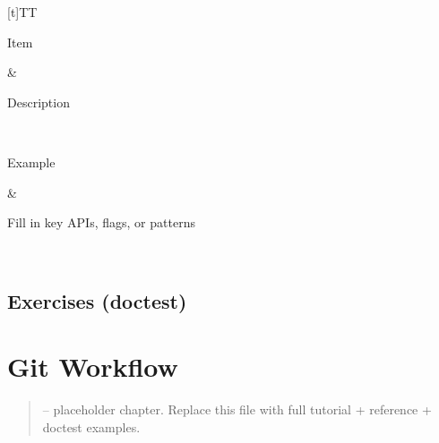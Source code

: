 \documentclass[a4paper,11pt,english]{sphinxmanual}
\begin{document}
\begin{savenotes}\sphinxattablestart
\sphinxthistablewithglobalstyle
\centering
\begin{tabulary}{\linewidth}[t]{TT}
\sphinxtoprule
\begin{varwidth}[t]{}
\sphinxstyletheadfamily \sphinxAtStartPar
Item
\sphinxbeforeendvarwidth
\end{varwidth}%
&\begin{varwidth}[t]{}
\sphinxstyletheadfamily \sphinxAtStartPar
Description
\sphinxbeforeendvarwidth
\end{varwidth}%
\\
\sphinxmidrule
\sphinxtableatstartofbodyhook\begin{varwidth}[t]{}
\sphinxAtStartPar
Example
\sphinxbeforeendvarwidth
\end{varwidth}%
&\begin{varwidth}[t]{}
\sphinxAtStartPar
Fill in key APIs, flags, or patterns
\sphinxbeforeendvarwidth
\end{varwidth}%
\\
\sphinxbottomrule
\end{tabulary}
\sphinxtableafterendhook\par
\sphinxattableend\end{savenotes}


\subsection{Exercises (doctest)}
\label{\detokenize{tooling/containerisation:exercises-doctest}}
\begin{sphinxVerbatim}[commandchars=\\\{\}]
\end{sphinxVerbatim}

\sphinxstepscope


\section{Git Workflow}
\label{\detokenize{tooling/git_workflow:git-workflow}}\label{\detokenize{tooling/git_workflow::doc}}\begin{quote}

\sphinxAtStartPar
{} – placeholder chapter. Replace this file with full tutorial + reference + doctest examples.
\end{quote}
\end{document}
